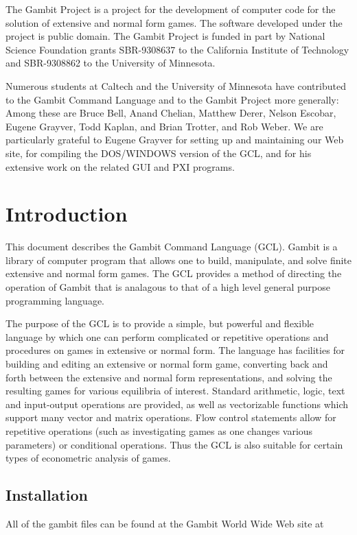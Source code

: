 The Gambit Project is a project for the development of computer code
for the solution of extensive and normal form games.  The software
developed under the project is public domain.  The Gambit Project is
funded in part by National Science Foundation grants SBR-9308637 to
the California Institute of Technology and SBR-9308862 to the
University of Minnesota.

Numerous students at Caltech and the University of Minnesota have
contributed to the Gambit Command Language and to the Gambit Project
more generally: Among these are Bruce Bell, Anand Chelian, Matthew
Derer, Nelson Escobar, Eugene Grayver, Todd Kaplan, and Brian Trotter,
and Rob Weber. We are particularly grateful to Eugene Grayver for
setting up and maintaining our Web site, for compiling the DOS/WINDOWS
version of the GCL, and for his extensive work on the related GUI and
PXI programs.

\chapter{Introduction}
\pagestyle{headings}

This document describes the Gambit Command Language (GCL).  Gambit is
a library of computer program that allows one to build, manipulate,
and solve finite extensive and normal form games. The GCL provides a
method of directing the operation of Gambit that is analagous to that
of a high level general purpose programming language.

The purpose of the GCL is to provide a simple, but powerful and
flexible language by which one can perform complicated or repetitive
operations and procedures on games in extensive or normal form.  The
language has facilities for building and editing an extensive or
normal form game, converting back and forth between the extensive and
normal form representations, and solving the resulting games for
various equilibria of interest.  Standard arithmetic, logic, text and
input-output operations are provided, as well as vectorizable
functions which support many vector and matrix operations.  Flow
control statements allow for repetitive operations (such as
investigating games as one changes various parameters) or conditional
operations.  Thus the GCL is also suitable for certain types of
econometric analysis of games.


\section{Installation}
All of the gambit files can be found at the Gambit World Wide Web site
at

